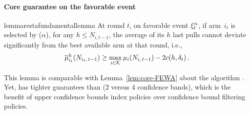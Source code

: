 \paragraph{Core guarantee on the favorable event}

\begin{restatable}{lemma}{restafundamentallemma}
\label{lem:core-RAWUCB}
At round $t$, on favorable event $\xi^\alpha_t$, if arm~$i_{t}$ is selected by \RUCB($\alpha$), for any $h \leq N_{i,t-1}$,  the average of its $h$ last pulls cannot deviate significantly from the best available arm at that round, i.e.,
%
\vspace{-4pt}
\begin{equation*}
\overline{\mu}_{i_t}^{h}(N_{i_t,\, t-1}) \geq \max_{i \in \mathcal{K}} \mu_{i}(N_{i,\,t-1}) - 2 c(h, \delta_t)\,.
\end{equation*}
\end{restatable}
This lemma is comparable with Lemma~\ref{lem:core-FEWA} about the algorithm \FEWA. Yet, \RUCB has tighter guarantees than \FEWA (2 versus 4 confidence bands), which is the benefit of upper confidence bounds index policies over confidence bound filtering policies. 

